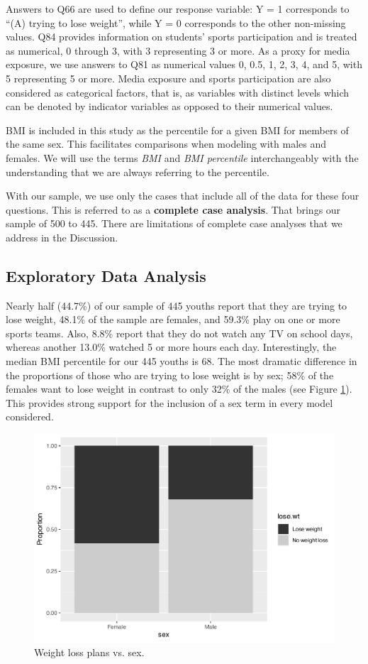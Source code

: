\documentclass[
]{krantz}
\begin{document}
Answers to Q66 are used to define our response variable: Y = 1 corresponds to ``(A) trying to lose weight'', while Y = 0 corresponds to the other non-missing values. Q84 provides information on students' sports participation and is treated as numerical, 0 through 3, with 3 representing 3 or more. As a proxy for media exposure, we use answers to Q81 as numerical values 0, 0.5, 1, 2, 3, 4, and 5, with 5 representing 5 or more. Media exposure and sports participation are also considered as categorical factors, that is, as variables with distinct levels which can be denoted by indicator variables as opposed to their numerical values.

BMI is included in this study as the percentile for a given BMI for members of the same sex. This facilitates comparisons when modeling with males and females. We will use the terms \emph{BMI} and \emph{BMI percentile} interchangeably with the understanding that we are always referring to the percentile.

With our sample, we use only the cases that include all of the data for these four questions. This is referred to as a \textbf{complete case analysis}. That brings our sample of 500 to 445. There are limitations of complete case analyses that we address in the Discussion.

\subsection{Exploratory Data Analysis}\label{exploratory-data-analysis-2}

Nearly half (44.7\%) of our sample of 445 youths report that they are trying to lose weight, 48.1\% of the sample are females, and 59.3\% play on one or more sports teams. Also, 8.8\% report that they do not watch any TV on school days, whereas another 13.0\% watched 5 or more hours each day. Interestingly, the median BMI percentile for our 445 youths is 68. The most dramatic difference in the proportions of those who are trying to lose weight is by sex; 58\% of the females want to lose weight in contrast to only 32\% of the males (see Figure \ref{fig:mosaicsexlose}). This provides strong support for the inclusion of a sex term in every model considered.

\begin{figure}

{\centering \includegraphics[width=0.6\linewidth]{bookdown-BeyondMLR_files/figure-latex/mosaicsexlose-1} 

}

\caption{Weight loss plans vs. sex.}\label{fig:mosaicsexlose}
\end{figure}
\end{document}
